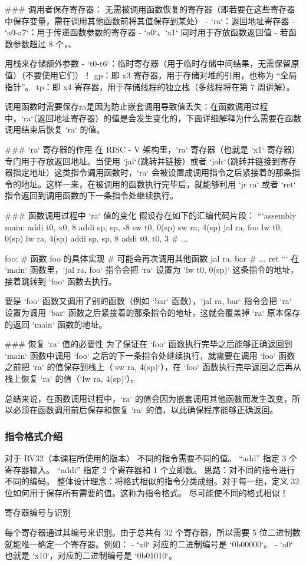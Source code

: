 \documentclass{ctexart}
\begin{document}
### 调用者保存寄存器：  
无需被调用函数恢复的寄存器（即若要在这些寄存器中保存变量，需在调用其他函数前将其值保存到某处）  
- `ra`：返回地址寄存器  
- `a0-a7`：用于传递函数参数的寄存器  
  - `a0`、`a1` 同时用于存放函数返回值  
  - 若函数参数超过 8 个，、\par
  用栈来存储额外参数  
- `t0-t6`：临时寄存器（用于临时存储中间结果，无需保留原值）（不要使用它们）！
gp：即 x3 寄存器，用于存储对堆的引用，也称为 “全局指针”。
tp：即 x4 寄存器，用于存储线程的独立栈（多线程将在第 7 周讲解）。\par
调用函数时需要保存ra是因为防止嵌套调用导致值丢失：在函数调用过程中，`ra`（返回地址寄存器）的值是会发生变化的，下面详细解释为什么需要在函数调用结束后恢复 `ra` 的值。

### `ra` 寄存器的作用
在 RISC - V 架构里，`ra` 寄存器（也就是 `x1` 寄存器）专门用于存放返回地址。当使用 `jal`（跳转并链接）或者 `jalr`（跳转并链接到寄存器指定地址）这类指令调用函数时，`ra` 会被设置成调用指令之后紧接着的那条指令的地址。这样一来，在被调用的函数执行完毕后，就能够利用 `jr ra` 或者 `ret` 指令返回到调用函数的下一条指令处继续执行。

### 函数调用过程中 `ra` 值的变化
假设存在如下的汇编代码片段：
```assembly
main:
    addi t0, x0, 8
    addi sp, sp, -8
    sw t0, 0(sp)
    sw ra, 4(sp)
    jal ra, foo
    lw t0, 0(sp)
    lw ra, 4(sp)
    addi sp, sp, 8
    addi t0, t0, 3
    # ...

foo:
    # 函数 foo 的具体实现
    # 可能会再次调用其他函数
    jal ra, bar
    # ...
    ret
```
在 `main` 函数里，`jal ra, foo` 指令会把 `ra` 设置为 `lw t0, 0(sp)` 这条指令的地址，接着跳转到 `foo` 函数去执行。

要是 `foo` 函数又调用了别的函数（例如 `bar` 函数），`jal ra, bar` 指令会把 `ra` 设置为调用 `bar` 函数之后紧接着的那条指令的地址，这就会覆盖掉 `ra` 原本保存的返回 `main` 函数的地址。

### 恢复 `ra` 值的必要性
为了保证在 `foo` 函数执行完毕之后能够正确返回到 `main` 函数中调用 `foo` 之后的下一条指令处继续执行，就需要在调用 `foo` 函数之前把 `ra` 的值保存到栈上（`sw ra, 4(sp)`），在 `foo` 函数执行完毕返回之后再从栈上恢复 `ra` 的值（`lw ra, 4(sp)`）。

总结来说，在函数调用过程中，`ra` 的值会因为嵌套调用其他函数而发生改变，所以必须在函数调用前后保存和恢复 `ra` 的值，以此确保程序能够正确返回。 \par
\subsubsection{指令格式介绍}
对于 RV32（本课程所使用的版本）
不同的指令需要不同的值。
“add” 指定 3 个寄存器输入。
“addi” 指定 2 个寄存器和 1 个立即数。
思路：对不同的指令进行不同的编码。
整体设计理念：将格式相似的指令分类成组。对于每一组，定义 32 位如何用于保存所有需要的值。这称为指令格式。
尽可能使不同的格式相似！\par
 寄存器编号与识别\par
每个寄存器通过其编号来识别。由于总共有 32 个寄存器，所以需要 5 位二进制数就能唯一确定一个寄存器。例如：
 - `x0` 对应的二进制编号是 `0b00000`。
 - `a0` 也就是 `x10`，对应的二进制编号是 `0b01010`。\par
\end{document}
